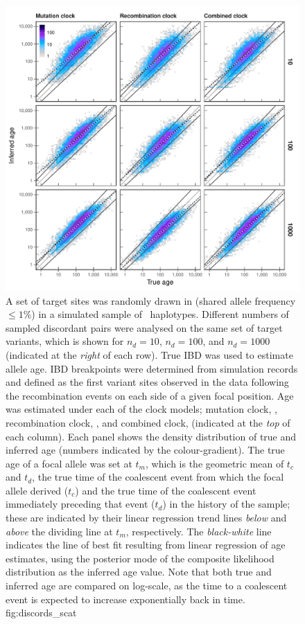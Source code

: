 

\begin{figure}[p]
\includegraphics[width=\textwidth]{./img/ch5/discords_scat}
{A set of  target sites was randomly drawn in \fk{[2,20]} (shared allele frequency ${\leq 1\%}$) in a simulated sample of ~haplotypes.
Different numbers of sampled discordant pairs were analysed on the same set of target variants, which is shown for ${n_d = \num{10}}$, ${n_d = \num{100}}$, and ${n_d = \num{1000}}$ (indicated at the \emph{right} of each row).
True IBD was used to estimate allele age.
IBD breakpoints were determined from simulation records and defined as the first variant sites observed in the data following the  recombination events on each side of a given focal position.
Age was estimated under each of the  clock models; \ie mutation clock, \ClockM, recombination clock, \ClockR, and combined clock, \ClockC (indicated at the \emph{top} of each column).
Each panel shows the density distribution of true and inferred age (numbers indicated by the colour-gradient).
The true age of a focal allele was set at $t_m$, which is the geometric mean of $t_c$ and $t_d$, \ie the true time of the coalescent event from which the focal allele derived ($t_c$) and the true time of the coalescent event immediately preceding that event ($t_d$) in the history of the sample; these are indicated by their linear regression trend lines \emph{below} and \emph{above} the dividing line at $t_m$, respectively.
The \emph{black-white} line indicates the line of best fit resulting from linear regression of age estimates, using the posterior mode of the composite likelihood distribution as the inferred age value.
Note that both true and inferred age are compared on log-scale, as the time to a coalescent event is expected to increase exponentially back in time.}
{fig:discords_scat}
\end{figure}
